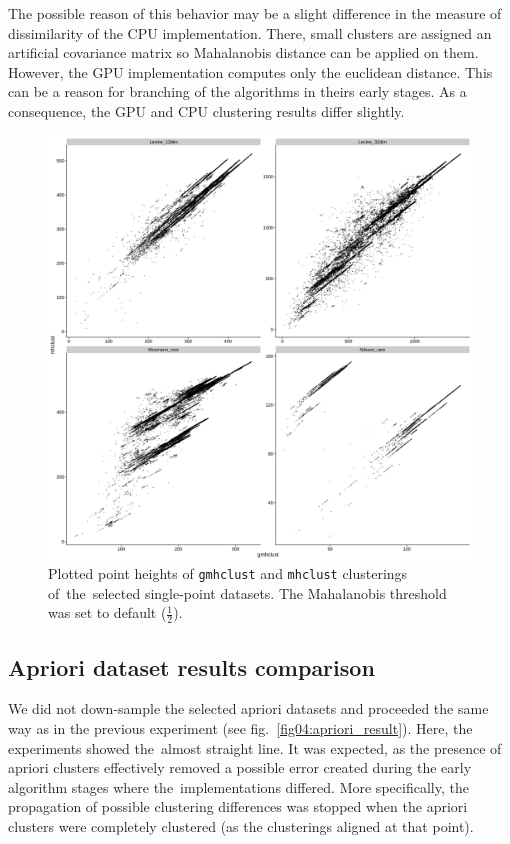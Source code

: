 The possible reason of this behavior may be a slight difference in the measure of dissimilarity of the CPU implementation. There, small clusters are assigned an artificial covariance matrix so Mahalanobis distance can be applied on them. However, the GPU implementation computes only the euclidean distance. This can be a reason for branching of the algorithms in theirs early stages. As a consequence, the GPU and CPU clustering results differ slightly.

\begin{figure}\centering
	\includegraphics[width=\linewidth]{img/single_result}
	\caption{Plotted point heights of \texttt{gmhclust} and \texttt{mhclust} clusterings of~the~selected single-point datasets. The Mahalanobis threshold was set to default ($\frac{1}{2}$).}
	\label{fig04:single_result}
\end{figure}

\subsection{Apriori dataset results comparison}

We did not down-sample the selected apriori datasets and proceeded the same way as in the previous experiment (see fig.~\ref{fig04:apriori_result}). Here, the experiments showed the~almost straight line. It was expected, as the presence of apriori clusters effectively removed a possible error created during the early algorithm stages where the~implementations differed. More specifically, the propagation of possible clustering differences was stopped when the apriori clusters were completely clustered (as the clusterings aligned at that point).

